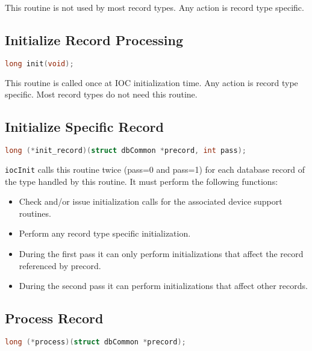 This routine is not used by most record types.
Any action is record type specific.

\subsection{Initialize Record Processing}

\begin{lstlisting}[language=C]
long init(void);
\end{lstlisting}

This routine is called once at IOC initialization time.
Any action is record type specific.
Most record types do not need this routine.

\subsection{Initialize Specific Record}

\begin{lstlisting}[language=C]
long (*init_record)(struct dbCommon *precord, int pass);
\end{lstlisting}

\verb|iocInit| calls this routine twice (pass=0 and pass=1) for each database record of the type handled by this routine.
It must perform the following functions:

\begin{itemize}
\item Check and/or issue initialization calls for the associated device support routines.

\item Perform any record type specific initialization.

\item During the first pass it can only perform initializations that affect the record referenced by precord.

\item During the second pass it can perform initializations that affect other records.

\end{itemize}

\subsection{Process Record}

\begin{lstlisting}[language=C]
long (*process)(struct dbCommon *precord);
\end{lstlisting}

